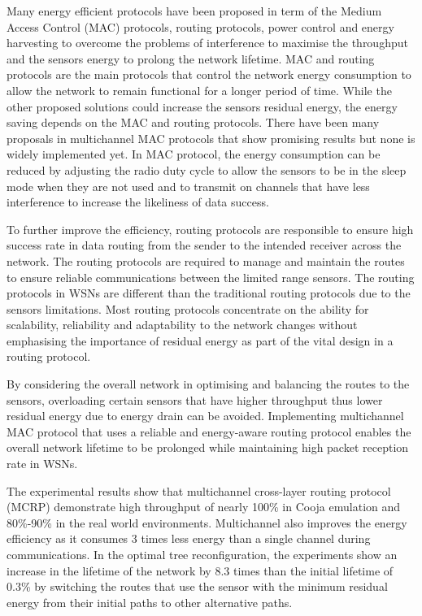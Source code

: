 Many energy efficient protocols have been proposed in term of the Medium Access Control (MAC) protocols, routing protocols, power control and energy harvesting to overcome the problems of interference to maximise the throughput and the sensors energy to prolong the network lifetime. 
MAC and routing protocols are the main protocols that control the network energy consumption to allow the network to remain functional for a longer period of time. While the other proposed solutions could increase the sensors residual energy, the energy saving depends on the MAC and routing protocols.
There have been many proposals in multichannel MAC protocols that show promising results but none is widely implemented yet. In MAC protocol, the energy consumption can be reduced by adjusting the radio duty cycle to allow the sensors to be in the sleep mode when they are not used and to transmit on channels that have less interference to increase the likeliness of data success.

To further improve the efficiency, routing protocols are responsible to ensure high success rate in data routing from the sender to the intended receiver across the network. 
The routing protocols are required to manage and maintain the routes to ensure reliable communications between the limited range sensors. The routing protocols in WSNs are different than the traditional routing protocols due to the sensors limitations. 
Most routing protocols concentrate on the ability for scalability, reliability and adaptability to the network changes without emphasising the importance of residual energy as part of the vital design in a routing protocol. 

By considering the overall network in optimising and balancing the routes to the sensors, overloading certain sensors that have higher throughput thus lower residual energy due to energy drain can be avoided.
Implementing multichannel MAC protocol that uses a reliable and energy-aware routing protocol enables the overall network lifetime to be prolonged while maintaining high packet reception rate in WSNs.

The experimental results show that multichannel cross-layer routing protocol (MCRP)\cite{mcrp} demonstrate high throughput of nearly 100\% 
in Cooja emulation and 80\%-90\% in the real world environments. Multichannel also improves the energy efficiency as it consumes 3 times less energy than a single channel during communications.
In the optimal tree reconfiguration, the experiments show an increase in the lifetime of the network by 8.3 times than the initial lifetime of 0.3\% by switching the routes that use the sensor with the minimum residual energy from their initial paths to other alternative paths.

